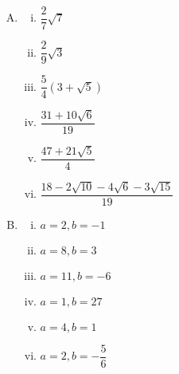 \begin{enumerate}[Q.1]
\item 
\begin{multicols}{3}
\begin{enumerate}[(i)]
\item $\dfrac{2}{7}\sqrt{7}$
\item $\dfrac{2}{9}\sqrt{3}$
\item $\dfrac{5}{4}(3+\sqrt{5})$
\item $\dfrac{31+10\sqrt{6}}{19}$
\item $\dfrac{47+21\sqrt{5}}{4}$
\item $\dfrac{18-2\sqrt{10}-4\sqrt{6}-3\sqrt{15}}{19}$
\end{enumerate}
\end{multicols}
\item 
\begin{multicols}{3}
\begin{enumerate}[(i)]
\item $a = 2, b = -1$
\item $a = 8, b = 3$
\item $a = 11, b = -6$
\item $a = 1, b = 27$
\item $a = 4, b = 1$
\item $a = 2, b = -\dfrac{5}{6}$
\end{enumerate}
\end{multicols}
\end{enumerate}
